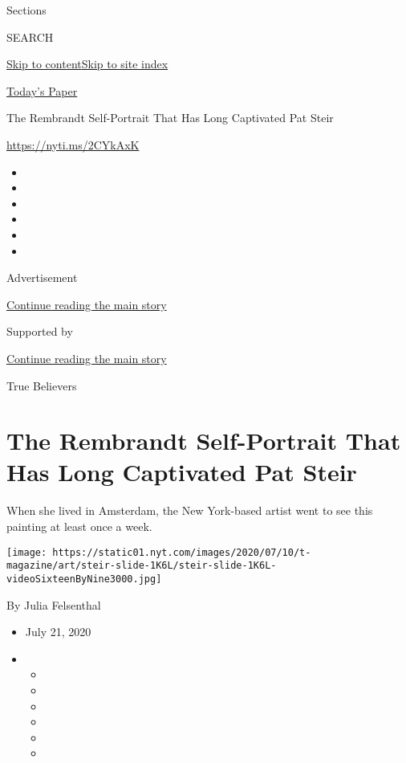 Sections

SEARCH

\protect\hyperlink{site-content}{Skip to
content}\protect\hyperlink{site-index}{Skip to site index}

\href{https://myaccount.nytimes.com/auth/login?response_type=cookie\&client_id=vi}{}

\href{https://www.nytimes.com/section/todayspaper}{Today's Paper}

The Rembrandt Self-Portrait That Has Long Captivated Pat Steir

\url{https://nyti.ms/2CYkAxK}

\begin{itemize}
\item
\item
\item
\item
\item
\item
\end{itemize}

Advertisement

\protect\hyperlink{after-top}{Continue reading the main story}

Supported by

\protect\hyperlink{after-sponsor}{Continue reading the main story}

True Believers

\hypertarget{the-rembrandt-self-portrait-that-has-long-captivated-pat-steir}{%
\section{The Rembrandt Self-Portrait That Has Long Captivated Pat
Steir}\label{the-rembrandt-self-portrait-that-has-long-captivated-pat-steir}}

When she lived in Amsterdam, the New York-based artist went to see this
painting at least once a week.

\texttt{[image: https://static01.nyt.com/images/2020/07/10/t-magazine/art/steir-slide-1K6L/steir-slide-1K6L-videoSixteenByNine3000.jpg]}

By Julia Felsenthal

\begin{itemize}
\item
  July 21, 2020
\item
  \begin{itemize}
  \item
  \item
  \item
  \item
  \item
  \item
  \end{itemize}
\end{itemize}


